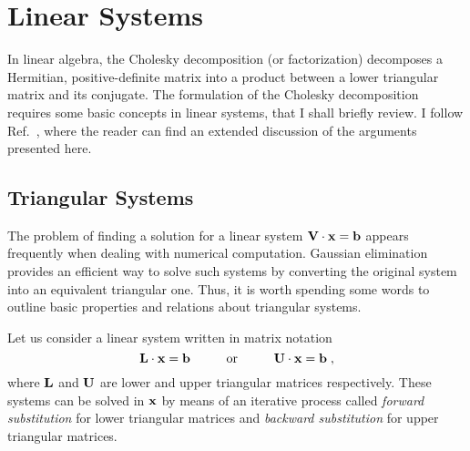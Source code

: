 \chapter{Linear Systems}
\label{app:lin_sys}

In linear algebra, the Cholesky decomposition (or factorization) decomposes a Hermitian, positive-definite matrix into a product between a lower triangular matrix and its conjugate. The formulation of the Cholesky decomposition requires some basic concepts in linear systems, that I shall briefly review. I follow Ref.~\cite{GoluVanl96}, where the reader can find an extended discussion of the arguments presented here.

\section{Triangular Systems}
The problem of finding a solution for a linear system $\mathbf{V} \cdot \mathbf{x} = \mathbf{b}$ appears frequently when dealing with numerical computation. Gaussian elimination provides an efficient way to solve such systems by converting the  original system into an equivalent triangular one. Thus, it is worth spending some words to outline basic properties and relations about triangular systems.%

Let us consider a linear system written in matrix notation
\begin{equation}
    \mb{L} \cdot \mb{x} = \mb{b} \hspace{10mm} \textrm{or} \hspace{10mm} \mb{U} \cdot \mb{x} = \mb{b} \; ,
\end{equation}
where $\mathbf{L}$ and $\mathbf{U}$ are lower and upper triangular matrices respectively. These systems can be solved in $\mathbf{x}$ by means of an iterative process called \textit{forward substitution} for lower triangular matrices and \textit{backward substitution} for upper triangular matrices. 


